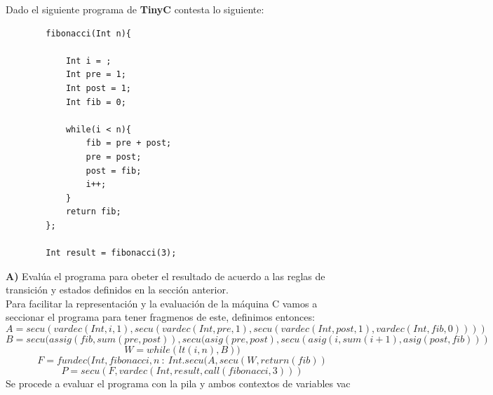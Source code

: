 \begin{exercise}
    Dado el siguiente programa de \textbf{TinyC} contesta lo siguiente:
    \begin{lstlisting}
        fibonacci(Int n){
        
            Int i = ;
            Int pre = 1;
            Int post = 1;
            Int fib = 0;
            
            while(i < n){
                fib = pre + post;
                pre = post;
                post = fib;
                i++;
            }
            return fib;
        };

        Int result = fibonacci(3);
    \end{lstlisting}

    \textbf{A)} Evalúa el programa para obeter el resultado de acuerdo a las reglas de transición y estados definidos en la sección anterior.\\

    Para facilitar la representación y la evaluación de la máquina C vamos a seccionar el programa para tener fragmenos de este, definimos entonces:
    \[
        A = secu(vardec(Int, i, 1), secu(vardec(Int, pre, 1), secu(vardec(Int, post, 1), vardec(Int, fib, 0))))
    \]
    \[
        B = secu(assig(fib, sum(pre,post)), secu(asig(pre,post), secu(asig(i,sum(i+1), asig(post,fib)))
    \]
    \[
        W = while(lt(i,n),B))
    \]
    \[
        F = fundec(Int, fibonacci,n\ :\ Int.secu(A,secu(W, return(fib))
    \]
    \[
        P = secu(F,vardec(Int, result, call(fibonacci, 3)))
    \]
    Se procede a evaluar el programa con la pila y ambos contextos de variables vac


\end{exercise}
